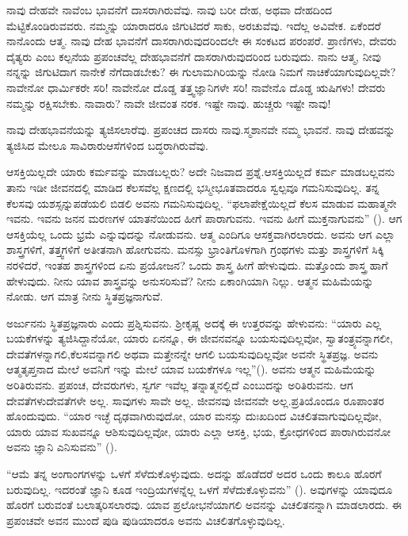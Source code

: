 ನಾವು ದೇಹವೇ ನಾವೆಂಬ ಭಾವನೆಗೆ ದಾಸರಾಗಿರುವೆವು. ನಾವು ಬರೀ ದೇಹ, ಅಥವಾ ದೇಹದಿಂದ ಮೆಟ್ಟಿಕೊಂಡಿರುವವರು. ನಮ್ಮನ್ನು ಯಾರಾದರೂ ಜಿಗುಟಿದರೆ ಸಾಕು, ಅರಚುವೆವು. ಇದೆಲ್ಲ ಅವಿವೇಕ. ಏಕೆಂದರೆ ನಾನೊಂದು ಆತ್ಮ. ನಾವು ದೇಹ ಭಾವನೆಗೆ ದಾಸರಾಗಿರುವುದರಿಂದಲೇ ಈ ಸಂಕಟದ ಪರಂಪರೆ. ಪ್ರಾಣಿಗಳು, ದೇವರು ದೈತ್ಯರು ಎಂಬ ಕಲ್ಪನೆಯ ಪ್ರಪಂಚವೆಲ್ಲ ದೇಹಭಾವನೆಗೆ ದಾಸರಾಗಿರುವುದರಿಂದ ಬರುವುದು. ನಾನು ಆತ್ಮ, ನೀವು ನನ್ನನ್ನು ಜಿಗುಟಿದಾಗ ನಾನೇಕೆ ನೆಗೆದಾಡಬೇಕು? ಈ ಗುಲಾಮಗಿರಿಯನ್ನು ನೋಡಿ ನಿಮಗೆ ನಾಚಿಕೆಯಾಗುವುದಿಲ್ಲವೇ? ನಾವೇನೋ ಧಾರ್ಮಿಕರೇ ಸರಿ! ನಾವೇನೋ ದೊಡ್ಡ ತತ್ತ್ವಜ್ಞಾನಿಗಳೇ ಸರಿ! ನಾವೇನೊ ದೊಡ್ಡ ಋಷಿಗಳು! ದೇವರು ನಮ್ಮನ್ನು ರಕ್ಷಿಸಬೇಕು. ನಾವಾರು? ನಾವೇ ಜೀವಂತ ನರಕ. ಇಷ್ಟೇ ನಾವು. ಹುಚ್ಚರು ಇಷ್ಟೇ ನಾವು!

ನಾವು ದೇಹಭಾವನೆಯನ್ನು ತ್ಯಜಿಸಲಾರೆವು. ಪ್ರಪಂಚದ ದಾಸರು ನಾವು.\break ಸ್ಮಶಾನವೇ ನಮ್ಮ ಭಾವನೆ. ನಾವು ದೇಹವನ್ನು ತ್ಯಜಿಸಿದ ಮೇಲೂ ಸಾವಿರಾರು\break ಆಸೆಗಳಿಂದ ಬದ್ಧರಾಗಿರುವೆವು.

ಆಸಕ್ತಿಯಿಲ್ಲದೇ ಯಾರು ಕರ್ಮವನ್ನು ಮಾಡಬಲ್ಲರು? ಅದೇ ನಿಜವಾದ ಪ್ರಶ್ನೆ.\break ಆಸಕ್ತಿಯಿಲ್ಲದೆ ಕರ್ಮ ಮಾಡಬಲ್ಲವನು ತಾನು ಇಡೀ ಜೀವನದಲ್ಲಿ ಮಾಡಿದ ಕೆಲಸವೆಲ್ಲ ಕ್ಷಣದಲ್ಲಿ ಭಸ್ಮೀಭೂತವಾದರೂ ಸ್ವಲ್ಪವೂ ಗಮನಿಸುವುದಿಲ್ಲ. ತನ್ನ ಕೆಲಸವು ಯಶಸ್ಸನ್ನು\break ಪಡೆಯಲಿ ಬಿಡಲಿ ಅವನು ಗಮನಿಸುವುದಿಲ್ಲ. “ಫಲಾಪೇಕ್ಷೆಯಿಲ್ಲದೆ ಕೆಲಸ ಮಾಡುವ ಮಹಾತ್ಮನೇ ಇವನು. ಇವನು ಜನನ ಮರಣಗಳ ಯಾತನೆಯಿಂದ ಹೀಗೆ ಪಾರಾಗುವನು. ಇವನು ಹೀಗೆ ಮುಕ್ತನಾಗುವನು” (). ಆಗ ಆಸಕ್ತಿಯೆಲ್ಲ ಒಂದು ಭ್ರಮೆ ಎನ್ನುವುದನ್ನು ನೋಡುವನು. ಆತ್ಮ ಎಂದಿಗೂ ಆಸಕ್ತವಾಗಿರಲಾರದು. ಅವನು ಆಗ ಎಲ್ಲಾ ಶಾಸ್ತ್ರಗಳಿಗೆ, ತತ್ತ್ವಗಳಿಗೆ ಅತೀತನಾಗಿ ಹೋಗುವನು. ಮನಸ್ಸು ಭ್ರಾಂತಿಗೊಳಗಾಗಿ ಗ್ರಂಥಗಳು ಮತ್ತು ಶಾಸ್ತ್ರಗಳಿಗೆ ಸಿಕ್ಕಿ ನರಳಿದರೆ, ಇಂತಹ ಶಾಸ್ತ್ರಗಳಿಂದ ಏನು ಪ್ರಯೋಜನ? ಒಂದು ಶಾಸ್ತ್ರ ಹೀಗೆ ಹೇಳುವುದು. ಮತ್ತೊಂದು ಶಾಸ್ತ್ರ ಹಾಗೆ ಹೇಳುವುದು. ನೀನು ಯಾವ ಶಾಸ್ತ್ರವನ್ನು ಅನುಸರಿಸುವೆ? ನೀನು ಏಕಾಂಗಿಯಾಗಿ ನಿಲ್ಲು. ಆತ್ಮನ ಮಹಿಮೆಯನ್ನು ನೋಡು. ಆಗ ಮಾತ್ರ ನೀನು ಸ್ಥಿತಪ್ರಜ್ಞನಾಗುವೆ.

ಅರ್ಜುನನು ಸ್ಥಿತಪ್ರಜ್ಞನಾರು ಎಂದು ಪ್ರಶ್ನಿಸುವನು. ಶ‍್ರೀಕೃಷ್ಣ ಅದಕ್ಕೆ ಈ ಉತ್ತರವನ್ನು ಹೇಳುವನು: “ಯಾರು ಎಲ್ಲ ಬಯಕೆಗಳನ್ನು ತ್ಯಜಿಸಿದ್ದಾನೆಯೋ, ಯಾರು ಏನನ್ನೂ, ಈ ಜೀವನವನ್ನೂ ಬಯಸುವುದಿಲ್ಲವೋ, ಸ್ವಾತಂತ್ರ್ಯವನ್ನಾಗಲೀ, ದೇವತೆಗಳನ್ನಾಗಲಿ,\break ಕೆಲಸವನ್ನಾಗಲಿ ಅಥವಾ ಮತ್ತೇನನ್ನೇ ಆಗಲಿ ಬಯಸುವುದಿಲ್ಲವೋ ಅವನೇ ಸ್ಥಿತಪ್ರಜ್ಞ. ಅವನು ಆತ್ಮತೃಪ್ತನಾದ ಮೇಲೆ ಅವನಿಗೆ ಇನ್ನು ಮೇಲೆ ಯಾವ ಬಯಕೆಗಳೂ ಇಲ್ಲ”\break (). ಅವನು ಆತ್ಮನ ಮಹಿಮೆಯನ್ನು ಅರಿತಿರುವನು. ಪ್ರಪಂಚ, ದೇವರುಗಳು, ಸ್ವರ್ಗ ಇವೆಲ್ಲ ತನ್ನಾತ್ಮನಲ್ಲಿದೆ ಎಂಬುದನ್ನು ಅರಿತಿರುವನು. ಆಗ ದೇವತೆಗಳು\break ದೇವತೆಗಳೇ ಅಲ್ಲ. ಸಾವುಗಳು ಸಾವೇ ಅಲ್ಲ. ಜೀವನವು ಜೀವನವೇ ಅಲ್ಲ.\break ಪ್ರತಿಯೊಂದೂ ರೂಪಾಂತರ ಹೊಂದುವುದು. “ಯಾರ ಇಚ್ಛೆ ದೃಢವಾಗಿರುವುದೋ, ಯಾರ ಮನಸ್ಸು ದುಃಖದಿಂದ ವಿಚಲಿತವಾಗುವುದಿಲ್ಲವೋ, ಯಾರು ಯಾವ ಸುಖವನ್ನೂ ಆಶಿಸುವುದಿಲ್ಲವೋ, ಯಾರು ಎಲ್ಲಾ ಆಸಕ್ತಿ, ಭಯ, ಕ್ರೋಧಗಳಿಂದ ಪಾರಾಗಿರುವನೋ ಅವನು ಜ್ಞಾನಿ ಎನಿಸುವನು” ().

“ಆಮೆ ತನ್ನ ಅಂಗಾಂಗಗಳನ್ನು ಒಳಗೆ ಸೆಳೆದುಕೊಳ್ಳುವುದು. ಅದನ್ನು ಹೊಡೆದರೆ ಅದರ ಒಂದು ಕಾಲೂ ಹೊರಗೆ ಬರುವುದಿಲ್ಲ. ಇದರಂತೆ ಜ್ಞಾನಿ ಕೂಡ ಇಂದ್ರಿಯಗಳನ್ನೆಲ್ಲ ಒಳಗೆ ಸೆಳೆದುಕೊಳ್ಳುವನು” (). ಅವುಗಳನ್ನು ಯಾವುದೂ ಹೊರಗೆ ಬರುವಂತೆ ಬಲಾತ್ಕರಿಸಲಾರವು. ಯಾವ ಪ್ರಲೋಭನೆಯಾಗಲಿ ಅವನನ್ನು ವಿಚಲಿತನನ್ನಾಗಿ ಮಾಡಲಾರದು. ಈ ಪ್ರಪಂಚವೇ ಅವನ ಮುಂದೆ ಪುಡಿ ಪುಡಿಯಾದರೂ ಅವನು ವಿಚಲಿತಗೊಳ್ಳುವುದಿಲ್ಲ.


